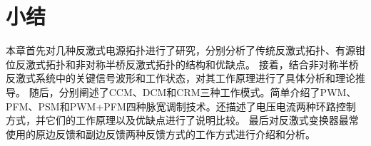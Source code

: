  

\section{小结}


本章首先对几种反激式电源拓扑进行了研究，分别分析了传统反激式拓扑、有源钳位反激式拓扑和非对称半桥反激式拓扑的结构和优缺点。
接着，结合非对称半桥反激式系统中的关键信号波形和工作状态，对其工作原理进行了具体分析和理论推导。
随后，分别阐述了CCM、DCM和CRM三种工作模式。简单介绍了PWM、PFM、PSM和PWM+PFM四种脉宽调制技术。还描述了电压电流两种环路控制方式，并它们的工作原理以及优缺点进行了说明比较。
最后对反激式变换器最常使用的原边反馈和副边反馈两种反馈方式的工作方式进行介绍和分析。

















